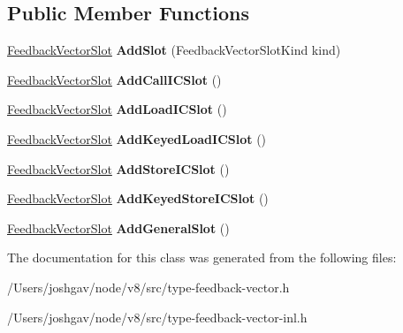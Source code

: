 \subsection*{Public Member Functions}
\begin{DoxyCompactItemize}
\item 
\hyperlink{classv8_1_1internal_1_1_feedback_vector_slot}{Feedback\+Vector\+Slot} {\bfseries Add\+Slot} (Feedback\+Vector\+Slot\+Kind kind)\hypertarget{classv8_1_1internal_1_1_feedback_vector_spec_base_a5904b60c86ddc2e4afaa1018cccd7888}{}\label{classv8_1_1internal_1_1_feedback_vector_spec_base_a5904b60c86ddc2e4afaa1018cccd7888}

\item 
\hyperlink{classv8_1_1internal_1_1_feedback_vector_slot}{Feedback\+Vector\+Slot} {\bfseries Add\+Call\+I\+C\+Slot} ()\hypertarget{classv8_1_1internal_1_1_feedback_vector_spec_base_a4d5c1e3e1e4b7ce867326d9724355936}{}\label{classv8_1_1internal_1_1_feedback_vector_spec_base_a4d5c1e3e1e4b7ce867326d9724355936}

\item 
\hyperlink{classv8_1_1internal_1_1_feedback_vector_slot}{Feedback\+Vector\+Slot} {\bfseries Add\+Load\+I\+C\+Slot} ()\hypertarget{classv8_1_1internal_1_1_feedback_vector_spec_base_a5ffd6e997737411555b0da1a8e07e804}{}\label{classv8_1_1internal_1_1_feedback_vector_spec_base_a5ffd6e997737411555b0da1a8e07e804}

\item 
\hyperlink{classv8_1_1internal_1_1_feedback_vector_slot}{Feedback\+Vector\+Slot} {\bfseries Add\+Keyed\+Load\+I\+C\+Slot} ()\hypertarget{classv8_1_1internal_1_1_feedback_vector_spec_base_a8aa68a308df9242f4ac1f5e9c33e3923}{}\label{classv8_1_1internal_1_1_feedback_vector_spec_base_a8aa68a308df9242f4ac1f5e9c33e3923}

\item 
\hyperlink{classv8_1_1internal_1_1_feedback_vector_slot}{Feedback\+Vector\+Slot} {\bfseries Add\+Store\+I\+C\+Slot} ()\hypertarget{classv8_1_1internal_1_1_feedback_vector_spec_base_af9498177103d3d23b4a3c0413b00f781}{}\label{classv8_1_1internal_1_1_feedback_vector_spec_base_af9498177103d3d23b4a3c0413b00f781}

\item 
\hyperlink{classv8_1_1internal_1_1_feedback_vector_slot}{Feedback\+Vector\+Slot} {\bfseries Add\+Keyed\+Store\+I\+C\+Slot} ()\hypertarget{classv8_1_1internal_1_1_feedback_vector_spec_base_ae4ece5a3e5b8b8de844d60372c61424c}{}\label{classv8_1_1internal_1_1_feedback_vector_spec_base_ae4ece5a3e5b8b8de844d60372c61424c}

\item 
\hyperlink{classv8_1_1internal_1_1_feedback_vector_slot}{Feedback\+Vector\+Slot} {\bfseries Add\+General\+Slot} ()\hypertarget{classv8_1_1internal_1_1_feedback_vector_spec_base_a499593339b41b4fc042dc40ebdf33915}{}\label{classv8_1_1internal_1_1_feedback_vector_spec_base_a499593339b41b4fc042dc40ebdf33915}

\end{DoxyCompactItemize}


The documentation for this class was generated from the following files\+:\begin{DoxyCompactItemize}
\item 
/\+Users/joshgav/node/v8/src/type-\/feedback-\/vector.\+h\item 
/\+Users/joshgav/node/v8/src/type-\/feedback-\/vector-\/inl.\+h\end{DoxyCompactItemize}
